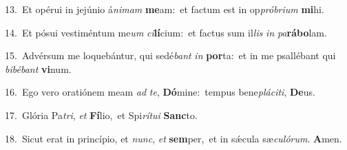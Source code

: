 {\numbfont\textcolor{\numbcolor}{13.}}~Et opérui in jejúnio á\-\textit{ni}\-\textit{mam} \textbf{me}\-am:~\star et factum est in op\-\textit{pró}\-\textit{bri}\textit{um} \textbf{mi}\-hi.\par
{\numbfont\textcolor{\numbcolor}{14.}}~Et pósui vestiméntum me\textit{um} \textit{ci}\-\textbf{lí}cium:~\star et factus sum il\textit{lis} \textit{in} \textit{pa}\-\textbf{rá}\textbf{bo}lam.\par
{\numbfont\textcolor{\numbcolor}{15.}}~Advérsum me loquebántur, qui sedé\textit{bant} \textit{in} \textbf{por}\-ta:~\star et in me psallébant qui \textit{bi}\-\textit{bé}\textit{bant} \textbf{vi}\-num.\par
{\numbfont\textcolor{\numbcolor}{16.}}~Ego vero oratiónem meam \textit{ad} \textit{te}\-, \textbf{Dó}\-mine:~\star tempus bene\-\textit{plá}\-\textit{ci}\textit{ti}, \textbf{De}\-us.\par
{\numbfont\textcolor{\numbcolor}{17.}}~Glória Pa\-\textit{tri}\-, \textit{et} \textbf{Fí}\-lio,~\star et Spi\-\textit{rí}\-\textit{tu}\textit{i} \textbf{Sanc}\-to.\par
{\numbfont\textcolor{\numbcolor}{18.}}~Sicut erat in princípio, et \textit{nunc}\-, \textit{et} \textbf{sem}\-per,~\star et in sǽcula sæ\-\textit{cu}\-\textit{ló}\textit{rum}. \textbf{A}\-men.\par
